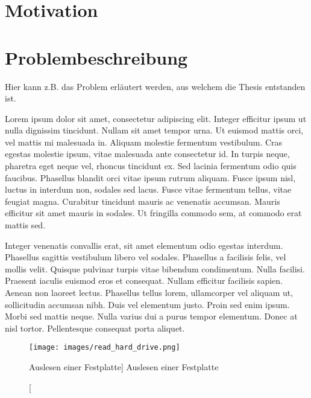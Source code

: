 \section{Motivation}

\section{Problembeschreibung}

Hier kann z.B. das Problem erläutert werden, aus welchem die Thesis entstanden ist.

Lorem ipsum dolor sit amet, consectetur adipiscing elit. Integer efficitur ipsum ut nulla dignissim tincidunt. Nullam sit amet tempor urna. Ut euismod mattis orci, vel mattis mi malesuada in. Aliquam molestie fermentum vestibulum. Cras egestas molestie ipsum, vitae malesuada ante consectetur id. In turpis neque, pharetra eget neque vel, rhoncus tincidunt ex. Sed lacinia fermentum odio quis faucibus. Phasellus blandit orci vitae ipsum rutrum aliquam. Fusce ipsum nisl, luctus in interdum non, sodales sed lacus. Fusce vitae fermentum tellus, vitae feugiat magna. Curabitur tincidunt mauris ac venenatis accumsan. Mauris efficitur sit amet mauris in sodales. Ut fringilla commodo sem, at commodo erat mattis sed.

Integer venenatis convallis erat, sit amet elementum odio egestas interdum. Phasellus sagittis vestibulum libero vel sodales. Phasellus a facilisis felis, vel mollis velit. Quisque pulvinar turpis vitae bibendum condimentum. Nulla facilisi. Praesent iaculis euismod eros et consequat. Nullam efficitur facilisis sapien. Aenean non laoreet lectus. Phasellus tellus lorem, ullamcorper vel aliquam ut, sollicitudin accumsan nibh. Duis vel elementum justo. Proin sed enim ipsum. Morbi sed mattis neque. Nulla varius dui a purus tempor elementum. Donec at nisl tortor. Pellentesque consequat porta aliquet. 

\clearpage

\begin{figure}[ht]
    \centering
    \texttt{[image: images/read\_hard\_drive.png]} %
    \caption
    [Auslesen einer Festplatte] %
    {Auslesen einer Festplatte\cite{quelle}} %
    \label{fig:old_db}
\end{figure}

